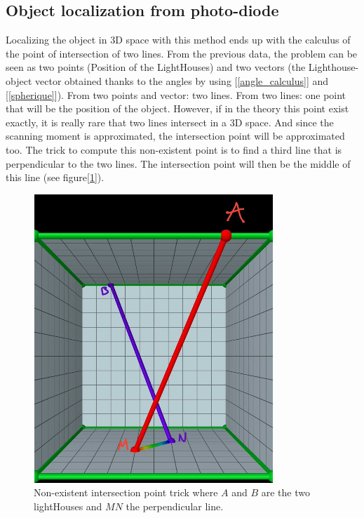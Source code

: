 \documentclass{vldb}
\begin{document}
\subsection{Object localization from photo-diode}
\label{Obj}
Localizing the object in 3D space with this method ends up with the calculus of the point of intersection of two lines. From the previous data, the problem can be seen as two points (Position of the LightHouses) and two vectors (the Lighthouse-object vector obtained thanks to the angles by using [\ref{angle_calculus}] and [\ref{spherique}]). From two points and vector: two lines. From two lines: one point that will be the position of the object. \newline
However, if in the theory this point exist exactly, it is really rare that two lines intersect in a 3D space. And since the scanning moment is approximated, the intersection point will be approximated too. The trick to compute this non-existent point is to find a third line that is perpendicular to the two lines. The intersection point will then be the middle of this line (see figure[\ref{inter}]).
\begin{figure}
\centering
\includegraphics[width=1.0\columnwidth]{Image/interscetion.png}
\caption{Non-existent intersection point trick where $A$ and $B$ are the two lightHouses and $MN$ the perpendicular line. \cite{cedric}}
\label{inter}
\end{figure}
\end{document}

